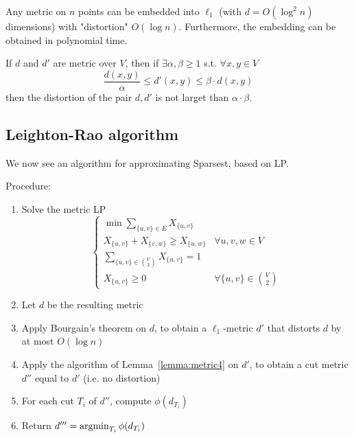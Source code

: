     \begin{theorem}
        Any metric on $n$ points can be embedded into $\ell_1$ (with $d = O(\log^2 n)$ dimensions) with "distortion" $O(\log n)$.
        Furthermore, the embedding can be obtained in polynomial time.
    \end{theorem}

    \begin{definition}[Distortion]
        If $d$ and $d'$ are metric over $V$, then if $\exists \alpha, \beta \geq 1$ s.t. $\forall x,y \in V$
        \[ \dfrac{d(x,y)}{\alpha} \leq d'(x,y) \leq \beta \cdot d(x,y) \]
        then the distortion of the pair $d,d'$ is not larget than $\alpha \cdot \beta$.
    \end{definition}


\subsection{Leighton-Rao algorithm}
    We now see an algorithm for approximating Sparsest, based on LP.

    Procedure:
    \begin{enumerate}
        \item Solve the metric LP
        \begin{equation}
            \begin{cases}
                \min \sum_{\{u,v\} \in E} X_{\{u,v\}}\\
                X_{\{u,v\}} + X_{\{v,w\}} \geq X_{\{u,w\}}          & \forall u,v,w \in V\\
                \sum_{\{u,v\} \in \binom{V}{2}} X_{\{u,v\}} = 1\\
                X_{\{u,v\}} \geq 0                                  & \forall \{u,v\} \in \binom{V}{2}
            \end{cases}
        \end{equation}
        \item Let $d$ be the resulting metric
        \item Apply Bourgain's theorem on $d$, to obtain a $\ell_1$-metric $d'$ that distorts $d$ by at most $O(\log n)$
        \item Apply the algorithm of Lemma~\ref{lemma:metric4} on $d'$, to obtain a cut metric $d''$ equal to $d'$ (i.e. no distortion)
        \item For each cut $T_i$ of $d''$, compute $\phi(d_{T_i})$
        \item Return $d''' = \operatorname*{argmin}_{T_i} \phi(d_{T_i})$
    \end{enumerate}

